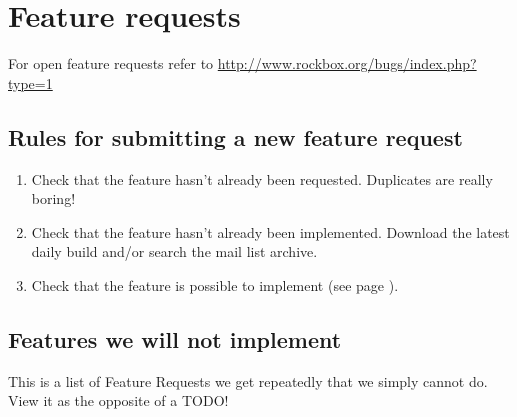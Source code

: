 \section{Feature requests}
For open feature requests refer to
\url{http://www.rockbox.org/bugs/index.php?type=1}

\subsection{Rules for submitting a new feature request}

\begin{enumerate}
\item Check that the feature hasn't already been requested. Duplicates are really boring!
\item Check that the feature hasn't already been implemented. Download the latest daily build and/or search the mail list archive.
\item Check that the feature is possible to implement (see page \pageref{ref:NODO}).
\end{enumerate}

\subsection{\label{ref:NODO}Features we will not implement}
This is a list of Feature Requests we get repeatedly that we simply
cannot do. View it as the opposite of a TODO!

